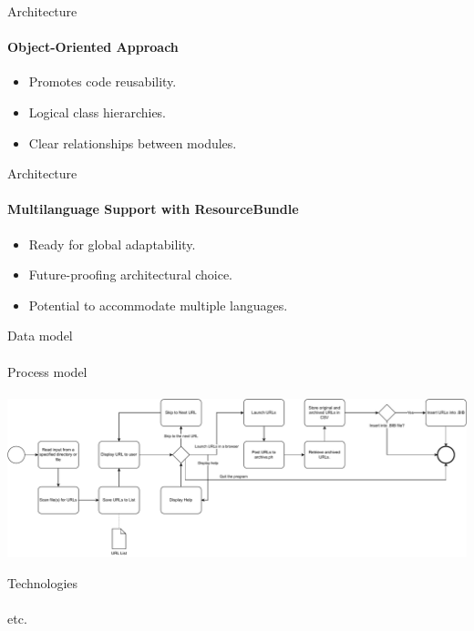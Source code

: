 \documentclass[
    ngerman,%
    authorontitle=true,
]{bfhbeamer}
\begin{document}
    \begin{frame}{Architecture}
        \framesubtitle{Object-Oriented Approach}
        \begin{itemize}
            \item Promotes code reusability.
            \item Logical class hierarchies.
            \item Clear relationships between modules.
        \end{itemize}
    \end{frame}

    \begin{frame}{Architecture}
        \framesubtitle{Multilanguage Support with ResourceBundle}
        \begin{itemize}
            \item Ready for global adaptability.
            \item Future-proofing architectural choice.
            \item Potential to accommodate multiple languages.
        \end{itemize}
    \end{frame}

    \begin{frame}{Data model}
        \framesubtitle{}
    \end{frame}

    \begin{frame}{Process model}
        \framesubtitle{}
        \includegraphics[width=1\textwidth]{pictures/process_model-detailed_curved.pdf}
    \end{frame}

    \begin{frame}{Technologies}
        \framesubtitle{}
    \end{frame}

    \begin{frame}{etc.}
        \framesubtitle{}
    \end{frame}
\end{document}
